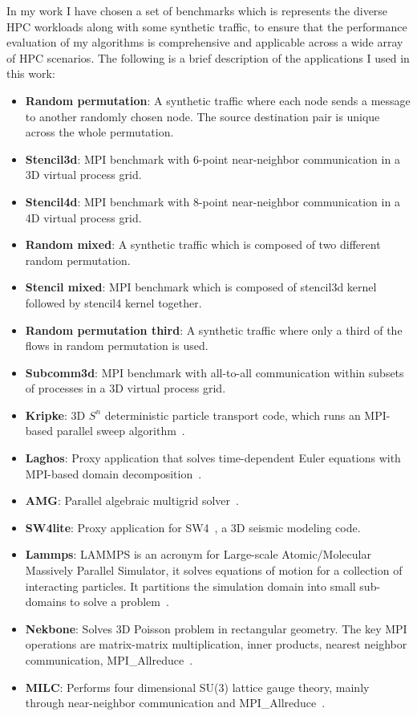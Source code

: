 In my work I have chosen a set of benchmarks which is represents the diverse HPC workloads along with some synthetic traffic, to ensure that the performance evaluation of my algorithms is comprehensive and applicable across a wide array of HPC scenarios.
The following is a brief description of the applications I used in this work:

\begin{itemize}
\item \textbf{Random permutation}: A synthetic traffic where each node sends a message to another randomly chosen node. The source destination pair is unique across the whole permutation.
\item \textbf{Stencil3d}: MPI benchmark with 6-point near-neighbor communication in a 3D virtual process grid.
\item \textbf{Stencil4d}: MPI benchmark with 8-point near-neighbor communication in a 4D virtual process grid.
\item \textbf{Random mixed}: A synthetic traffic which is composed of two different random permutation.
\item \textbf{Stencil mixed}: MPI benchmark which is composed of stencil3d kernel followed by stencil4 kernel together.
\item \textbf{Random permutation third}: A synthetic traffic where only a third of the flows in random permutation is used. 
\item \textbf{Subcomm3d}: MPI benchmark with all-to-all communication within subsets of processes in a 3D virtual process grid.
\item \textbf{Kripke}: 3D $S^n$ deterministic particle transport code, which runs an MPI-based parallel sweep algorithm~\cite{kripke}. 
\item \textbf{Laghos}: Proxy application that solves time-dependent Euler equations with MPI-based domain decomposition~\cite{laghos}.
\item \textbf{AMG}:  Parallel algebraic multigrid solver~\cite{amg}.
\item \textbf{SW4lite}: Proxy application for SW4~\cite{sjogreen2018sw4}, a 3D seismic modeling code.
\item \textbf{Lammps}: LAMMPS is an acronym for Large-scale Atomic/Molecular Massively Parallel Simulator, it solves equations of motion for a collection of interacting particles. It partitions the simulation domain into small sub-domains to solve a problem~\cite{thompson2022lammps}.
\item \textbf{Nekbone}: Solves 3D Poisson problem in rectangular geometry. The key MPI operations are matrix-matrix multiplication, inner products, nearest neighbor communication, MPI\_Allreduce~\cite{gong2016nekbone}.
\item \textbf{MILC}: Performs four dimensional SU(3) lattice gauge theory, mainly through near-neighbor communication and MPI\_Allreduce~\cite{gottlieb2001benchmarking}.
\end{itemize}

